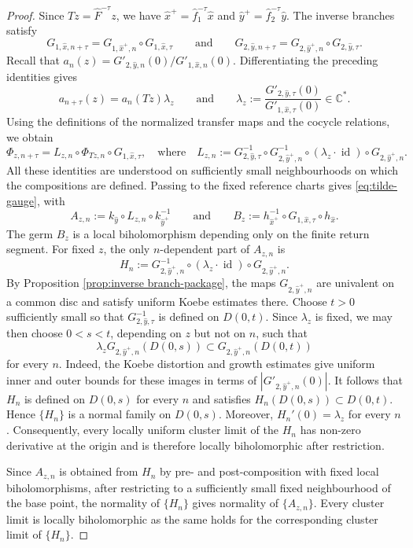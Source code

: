 \documentclass[10pt,a4paper]{amsart}
\begin{document}
\begin{proof}
Since $Tz=\hat F^{-\tau}z$, we have
$\hat x^+=\hat f_1^{-\tau}\hat x$ and
$\hat y^+=\hat f_2^{-\tau}\hat y$. The inverse branches satisfy
$$
G_{1,\hat x,n+\tau}
=
G_{1,\hat x^+,n}\circ G_{1,\hat x,\tau}
\qquad
\text{and}
\qquad
G_{2,\hat y,n+\tau}
=
G_{2,\hat y^+,n}\circ G_{2,\hat y,\tau}.
$$
Recall that
$a_n(z)=G'_{2,\hat y,n}(0)/G'_{1,\hat x,n}(0)$. Differentiating the
preceding identities gives
$$
a_{n+\tau}(z)
=
a_n(Tz)\lambda_z
\qquad
\text{and}
\qquad
\lambda_z
:=
\frac{G'_{2,\hat y,\tau}(0)}
     {G'_{1,\hat x,\tau}(0)}
\in\mathbb C^*.
$$
Using the definitions of the normalized transfer maps and the cocycle
relations, we obtain
$$
\Phi_{z,n+\tau}
=
L_{z,n}\circ
\Phi_{Tz,n}\circ
G_{1,\hat x,\tau},
\quad \text{where}
\quad
L_{z,n}
:=
G_{2,\hat y,\tau}^{-1}
\circ
G_{2,\hat y^+,n}^{-1}
\circ
(\lambda_z\cdot\operatorname{id})
\circ
G_{2,\hat y^+,n}.
$$
All these identities are understood on sufficiently small
neighbourhoods on which the compositions are defined.
Passing to the fixed reference charts gives
\eqref{eq:tilde-gauge}, with
$$
A_{z,n}
:=
k_{\hat y}\circ L_{z,n}\circ k_{\hat y^+}^{-1}
\qquad
\text{and}
\qquad
B_z
:=
h_{\hat x^+}^{-1}\circ
G_{1,\hat x,\tau}\circ h_{\hat x}.
$$
The germ $B_z$ is a local biholomorphism depending only on the finite
return segment.
For fixed $z$, the only $n$-dependent part of $A_{z,n}$ is 
$$
H_n
:=
G_{2,\hat y^+,n}^{-1}
\circ
(\lambda_z\cdot\operatorname{id})
\circ
G_{2,\hat y^+,n}.
$$
By Proposition \ref{prop:inverse branch-package}, the maps
$G_{2,\hat y^+,n}$ are univalent on a common disc and satisfy uniform
Koebe estimates there. Choose $t>0$ sufficiently small so that
$G_{2,\hat y,\tau}^{-1}$ is defined on $D(0,t)$. Since $\lambda_z$
is fixed, we may then choose $0<s<t$, depending on $z$ but not on
$n$, such that
$$
\lambda_z G_{2,\hat y^+,n}(D(0,s))
\subset
G_{2,\hat y^+,n}(D(0,t))
$$
for every $n$. Indeed, the Koebe distortion and growth estimates give
uniform inner and outer bounds for these images in terms of
$|G'_{2,\hat y^+,n}(0)|$.
It follows that $H_n$ is defined on $D(0,s)$ for every $n$ and
satisfies
$H_n(D(0,s))\subset D(0,t)$.
Hence $\{H_n\}$ is a normal family on $D(0,s)$.
Moreover,
$H_n'(0)=\lambda_z$
for every $n$.
Consequently, every locally uniform cluster limit of the $H_n$ has
non-zero derivative at the origin and is therefore locally
biholomorphic after restriction.

Since $A_{z,n}$ is obtained from $H_n$ by pre- and
post-composition with fixed local biholomorphisms,
after restricting
to a sufficiently small fixed neighbourhood of the base point, the
normality of $\{H_n\}$ gives normality of
$\{A_{z,n}\}$. Every cluster limit is locally biholomorphic as
the same holds for the corresponding cluster limit of $\{H_n\}$.
\end{proof}
\end{document}
